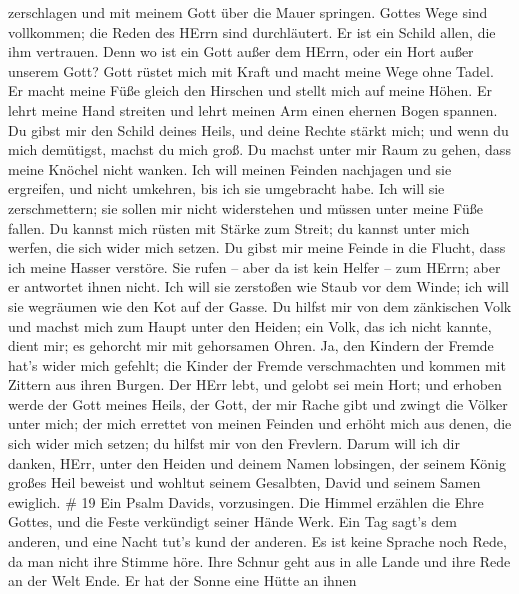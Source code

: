zerschlagen und mit meinem Gott über die Mauer springen. 
Gottes Wege sind vollkommen; die Reden des HErrn sind durchläutert. Er
ist ein Schild allen, die ihm vertrauen.  Denn wo ist ein
Gott außer dem HErrn, oder ein Hort außer unserem Gott? 
Gott rüstet mich mit Kraft und macht meine Wege ohne Tadel.
 Er macht meine Füße gleich den Hirschen und stellt mich
auf meine Höhen.  Er lehrt meine Hand streiten und lehrt
meinen Arm einen ehernen Bogen spannen.  Du gibst mir den
Schild deines Heils, und deine Rechte stärkt mich; und wenn du mich
demütigst, machst du mich groß.  Du machst unter mir Raum
zu gehen, dass meine Knöchel nicht wanken.  Ich will meinen
Feinden nachjagen und sie ergreifen, und nicht umkehren, bis ich sie
umgebracht habe.  Ich will sie zerschmettern; sie sollen
mir nicht widerstehen und müssen unter meine Füße fallen. 
Du kannst mich rüsten mit Stärke zum Streit; du kannst unter mich
werfen, die sich wider mich setzen.  Du gibst mir meine
Feinde in die Flucht, dass ich meine Hasser verstöre.  Sie
rufen -- aber da ist kein Helfer -- zum HErrn; aber er antwortet ihnen
nicht.  Ich will sie zerstoßen wie Staub vor dem Winde; ich
will sie wegräumen wie den Kot auf der Gasse.  Du hilfst
mir von dem zänkischen Volk und machst mich zum Haupt unter den Heiden;
ein Volk, das ich nicht kannte, dient mir;  es gehorcht mir
mit gehorsamen Ohren. Ja, den Kindern der Fremde hat's wider mich
gefehlt;  die Kinder der Fremde verschmachten und kommen
mit Zittern aus ihren Burgen.  Der HErr lebt, und gelobt
sei mein Hort; und erhoben werde der Gott meines Heils, 
der Gott, der mir Rache gibt und zwingt die Völker unter mich;
 der mich errettet von meinen Feinden und erhöht mich aus
denen, die sich wider mich setzen; du hilfst mir von den Frevlern.
 Darum will ich dir danken, HErr, unter den Heiden und
deinem Namen lobsingen,  der seinem König großes Heil
beweist und wohltut seinem Gesalbten, David und seinem Samen ewiglich.
\# 19  Ein Psalm Davids, vorzusingen.  Die
Himmel erzählen die Ehre Gottes, und die Feste verkündigt seiner Hände
Werk.  Ein Tag sagt's dem anderen, und eine Nacht tut's kund
der anderen.  Es ist keine Sprache noch Rede, da man nicht
ihre Stimme höre.  Ihre Schnur geht aus in alle Lande und
ihre Rede an der Welt Ende. Er hat der Sonne eine Hütte an ihnen
